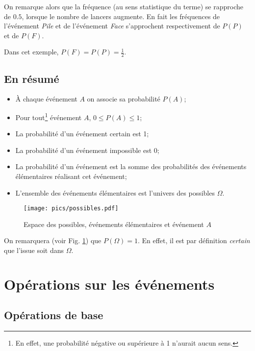 \documentclass[a4paper,12pt]{scrartcl}
\begin{document}
On remarque alors que la fréquence (au sens statistique du terme) se rapproche de $0.5$, lorsque le nombre de lancers augmente. En fait les fréquences de l'événement \emph{Pile} et de l'événement \emph{Face} s'approchent respectivement de $P(P)$ et de $P(F)$.

Dans cet exemple, $P(F) = P(P) = \frac{1}{2}$.

\subsection{En résumé}

\begin{itemize}
 \item À chaque événement $A$ on associe sa probabilité $P(A)$;
 \item Pour tout\footnote{En effet, une probabilité négative ou supérieure à 1 n'aurait aucun sens.} événement $A$, $0 \leqslant P(A) \leqslant 1$;
 \item La probabilité d'un événement certain est 1;
 \item La probabilité d'un événement impossible est 0;
 \item La probabilité d'un événement est la somme des probabilités des événements élémentaires réalisant cet événement;
 \item L'ensemble des événements élémentaires est l'univers des possibles $\Omega$.
\end{itemize}

%
\begin{figure}[h!!]
\begin{center}
  \texttt{[image: pics/possibles.pdf]}
 
\end{center}
 \caption{Espace des possibles, événements élémentaires et événement $A$}
 \label{fig:possibles}
\end{figure}

On remarquera (voir Fig. \ref{fig:possibles}) que $P(\Omega) = 1$. En effet, il est par définition \emph{certain} que l'issue soit dans $\Omega$.

\section{Opérations sur les événements}

\subsection{Opérations de base}
\end{document}
